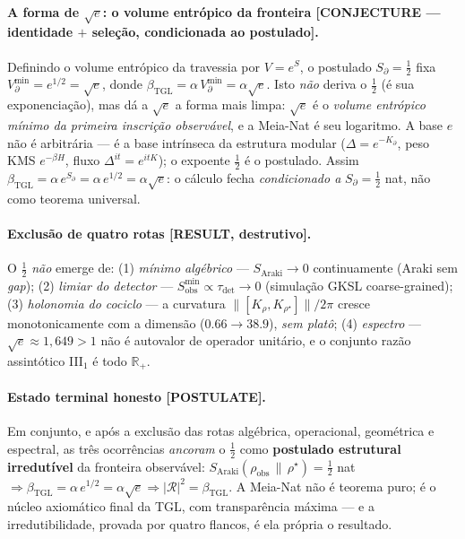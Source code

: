 \documentclass[12pt,a4paper]{article}
\newcommand{\betatgl}{\beta_{\text{TGL}}}
\newcommand{\Kpartial}{K_{\partial}}
\newcommand{\rhostar}{\rho^{\star}}
\newcommand{\TGL}{\textsc{TGL}}
\begin{document}
\paragraph{A forma de $\sqrt e$: o volume entrópico da fronteira \textbf{[CONJECTURE --- identidade $+$ seleção, condicionada ao postulado]}.} Definindo o volume entrópico da travessia por $V = e^{S}$, o postulado $S_\partial = \tfrac12$ fixa $V_\partial^{\min} = e^{1/2} = \sqrt e$, donde $\betatgl = \alpha\,V_\partial^{\min} = \alpha\sqrt e$. Isto \emph{não} deriva o $\tfrac12$ (é sua exponenciação), mas dá a $\sqrt e$ a forma mais limpa: $\sqrt e$ é o \emph{volume entrópico mínimo da primeira inscrição observável}, e a Meia-Nat é seu logaritmo. A base $e$ não é arbitrária --- é a base intrínseca da estrutura modular ($\Delta = e^{-\Kpartial}$, peso KMS $e^{-\beta H}$, fluxo $\Delta^{it}=e^{itK}$); o expoente $\tfrac12$ é o postulado. Assim $\betatgl = \alpha\,e^{S_\partial} = \alpha\,e^{1/2} = \alpha\sqrt e$: o cálculo fecha \emph{condicionado a} $S_\partial = \tfrac12$ nat, não como teorema universal.

\paragraph{Exclusão de quatro rotas \textbf{[RESULT, destrutivo]}.} O $\tfrac12$ \emph{não} emerge de: (1) \emph{mínimo algébrico} --- $S_{\mathrm{Araki}}\to0$ continuamente (Araki sem \emph{gap}); (2) \emph{limiar do detector} --- $S_{\mathrm{obs}}^{\min}\propto\tau_{\det}\to0$ (simulação GKSL coarse-grained); (3) \emph{holonomia do cociclo} --- a curvatura $\lVert[K_\rho,K_{\rhostar}]\rVert/2\pi$ cresce monotonicamente com a dimensão ($0.66\to38.9$), \emph{sem platô}; (4) \emph{espectro} --- $\sqrt e \approx 1{,}649 > 1$ não é autovalor de operador unitário, e o conjunto razão assintótico III$_1$ é todo $\mathbb R_+$.

\paragraph{Estado terminal honesto \textbf{[POSTULATE]}.} Em conjunto, e após a exclusão das rotas algébrica, operacional, geométrica e espectral, as três ocorrências \emph{ancoram} o $\tfrac12$ como \textbf{postulado estrutural irredutível} da fronteira observável: $S_{\mathrm{Araki}}(\rho_{\mathrm{obs}}\,\|\,\rhostar) = \tfrac12$ nat $\Rightarrow \betatgl = \alpha\,e^{1/2} = \alpha\sqrt e \Rightarrow |\mathcal R|^2 = \betatgl$. A Meia-Nat não é teorema puro; é o núcleo axiomático final da \TGL{}, com transparência máxima --- e a irredutibilidade, provada por quatro flancos, é ela própria o resultado.
\end{document}
